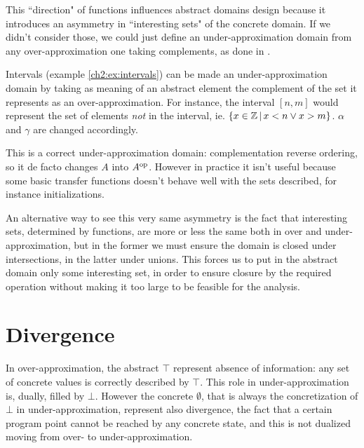 This ``direction" of functions influences abstract domains design because it introduces an asymmetry in ``interesting sets" of the concrete domain.
If we didn't consider those, we could just define an under-approximation domain from any over-approximation one taking complements, as done in \cite{lev-backward-analysis-complement}.
\begin{example}
	Intervals (example \ref{ch2:ex:intervals}) can be made an under-approximation domain by taking as meaning of an abstract element the complement of the set it represents as an over-approximation.
	For instance, the interval $[n, m]$ would represent the set of elements \textit{not} in the interval, ie. $\{ x \in \mathbb{Z} \,\vert\, x < n \lor x > m \}$.
	$\alpha$ and $\gamma$ are changed accordingly.

	This is a correct under-approximation domain: complementation reverse ordering, so it de facto changes $A$ into $A^{\text{op}}$. However in practice it isn't useful because some basic transfer functions doesn't behave well with the sets described, for instance initializations.
\end{example}

An alternative way to see this very same asymmetry is the fact that interesting sets, determined by functions, are more or less the same both in over and under-approximation, but in the former we must ensure the domain is closed under intersections, in the latter under unions. This forces us to put in the abstract domain only some interesting set, in order to ensure closure by the required operation without making it too large to be feasible for the analysis.

\section{Divergence}
In over-approximation, the abstract $\top$ represent absence of information: any set of concrete values is correctly described by $\top$. This role in under-approximation is, dually, filled by $\bot$.
However the concrete $\emptyset$, that is always the concretization of $\bot$ in under-approximation, represent also divergence, the fact that a certain program point cannot be reached by any concrete state, and this is not dualized moving from over- to under-approximation.


